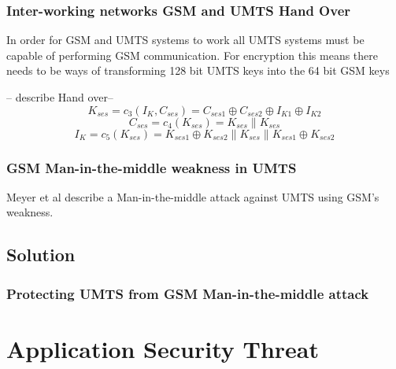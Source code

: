 \documentclass{beamer}
\begin{document}
	\begin{frame}
	
	\frametitle{Inter-working networks GSM and UMTS Hand Over}
	
	
	In order for GSM and UMTS systems to work all UMTS systems must be capable of performing GSM communication. For encryption this means there needs to be ways of transforming 128 bit UMTS keys into the 64 bit GSM keys 
	
	-- describe Hand over--
		\begin{equation}
			\label{C_3}
			\mathit{K_{ses} = c_{3}(I_{K},C_{ses}) = C_{ses1} \oplus 					C_{ses2}\oplus I_{K1} \oplus I_{K2}}
		\end{equation}
		\begin{equation} 
			\label{C_4}
			\mathit{C_{ses} = c_{4}(K_{ses}) = K_{ses} \| K_{ses}}
		\end{equation}
		\begin{equation}
			\label{C_5}
			\mathit{I_{K} = c_{5}(K_{ses}) = K_{ses1}\oplus K_{ses2}\|					K_{ses}\|K_{ses1}\oplus K_{ses2}}
		\end{equation}
	
\end{frame}	
		
\begin{frame}
	\frametitle{GSM Man-in-the-middle weakness in UMTS}
	Meyer et al describe a Man-in-the-middle attack against UMTS using GSM's weakness.
	\\
	
\end{frame}
\subsection{Solution}
\begin{frame}


\frametitle{Protecting UMTS from GSM Man-in-the-middle attack}
\end{frame}
\section{Application Security Threat}

\end{document}

